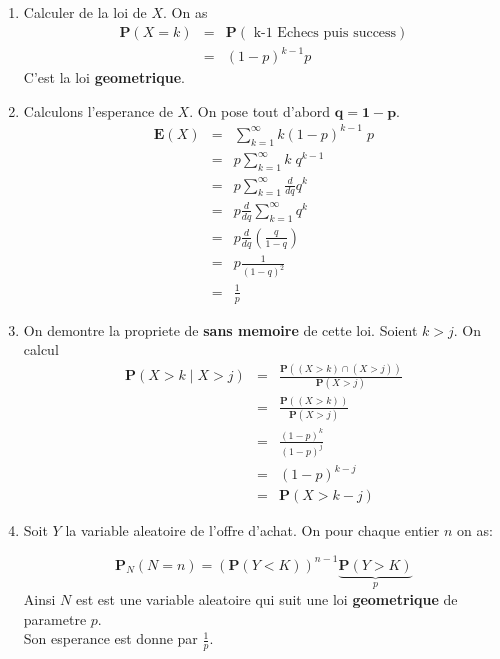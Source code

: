 \documentclass[a4paper]{tufte-handout}
\begin{document}
\begin{enumerate}
  \item Calculer de la loi de $X$.
    On as 
    \begin{eqnarray*} 
      \mathbf{P}(X = k) &=& \mathbf{P}(\text{ k-1 Echecs puis success})\\
                        &=& (1-p)^{k-1}p
    \end{eqnarray*}
    C'est la loi \textbf{geometrique}.
  \item Calculons l'esperance de $X$. On pose tout d'abord $\mathbf{q = 1-p}$.
    \begin{eqnarray*}
      \mathbf{E}(X) &=& \sum_{k=1}^\infty k (1-p)^{k-1}\;p\\
                    &=& p \sum_{k=1}^\infty k\;q^{k-1}\\
                    &=& p \sum_{k=1}^\infty \frac{d}{dq}q^k\\
                    &=& p \frac{d}{dq} \sum_{k=1}^\infty q^k\\
                    &=& p \frac{d}{dq}\left(\frac{q}{1-q}\right)\\
                    &=& p \frac{1}{(1-q)^2}\\
                    &=& \frac{1}{p}
    \end{eqnarray*}
  \item On demontre la propriete de \textbf{sans memoire} de cette loi. Soient
    $k > j $.  On calcul
    \begin{eqnarray*}
      \mathbf{P}(X > k \;|\; X > j) &=& \frac{\mathbf{P}\left( (X>k) \cap (X >
      j)\right)}{\mathbf{P}(X > j)}\\[4pt]
       &=& \frac{\mathbf{P}\left( (X>k)\right)}{\mathbf{P}(X > j)}\\[4pt]
       &=& \frac{(1-p)^k}{(1-p)^j}\\
       &=& (1-p)^{k-j}\\
       &=& \mathbf{P}(X > k -j)
    \end{eqnarray*}
  \item Soit $Y$ la variable aleatoire de l'offre d'achat. On pour chaque entier
    $n$ on as:

    $$
    \mathbf{P}_N(N = n) = \left(\mathbf{P}(Y < K)\right)^{n-1}\underbrace{\mathbf{P}\left(Y>K\right)}_{p}
    $$
    Ainsi $N$ est est une variable aleatoire qui suit une loi
    \textbf{geometrique} de parametre $p$.\\

  Son esperance est donne par $\frac{1}{p}$.
\end{enumerate}
\end{document}
